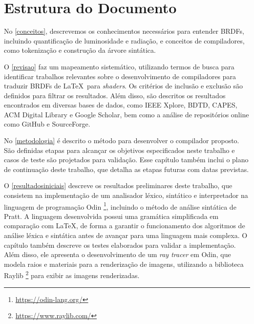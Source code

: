 \documentclass[english, 
               brazil, 
               bsc] %
               {dcomp-abntex2}
\begin{document}
\section{Estrutura do Documento}
No \autoref{conceitos}, descrevemos os conhecimentos necessários para entender BRDFs, incluindo quantificação de luminosidade e radiação, e  conceitos de compiladores, como tokenização e construção da árvore sintática.


O \autoref{revisao} faz um mapeamento sistemático, utilizando termos de busca para identificar trabalhos relevantes sobre o desenvolvimento de compiladores para traduzir BRDFs de \LaTeX\  para \textit{shaders}. Os critérios de inclusão e exclusão são definidos para filtrar os resultados. Além disso, são descritos os resultados encontrados em diversas bases de dados, como IEEE Xplore, BDTD, CAPES, ACM Digital Library e Google Scholar, bem como a análise de repositórios online como GitHub e SourceForge. 


No \autoref{metodologia} é descrito o método para desenvolver o compilador proposto. São definidas etapas para alcançar os objetivos especificados neste trabalho e casos de teste são projetados para validação. Esse capítulo também inclui o plano de continuação deste trabalho, que detalha as etapas futuras com datas previstas.




O \autoref{resultadosiniciais} descreve os resultados preliminares deste trabalho, que consistem na implementação de um analisador léxico, sintático e interpretador na linguagem de programação Odin \footnote{\url{https://odin-lang.org/}}, incluindo o método de análise sintática de Pratt. A linguagem desenvolvida possui uma gramática simplificada em comparação com \LaTeX, de forma a garantir o funcionamento dos algoritmos de análise léxica e sintática antes de avançar para uma linguagem mais complexa. O capítulo também descreve os testes elaborados para validar a implementação. Além disso, ele apresenta o desenvolvimento de um \textit{ray tracer} em Odin, que modela raios e materiais para a renderização de imagens, utilizando a biblioteca Raylib \footnote{\url{https://www.raylib.com/}} para exibir as imagens renderizadas.
\end{document}
